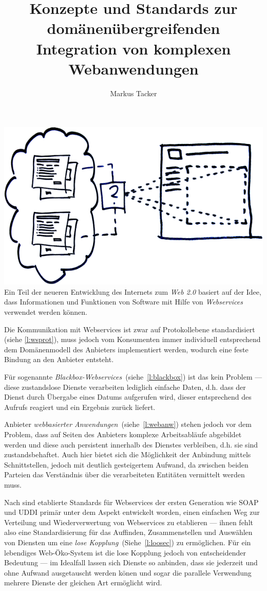 \documentclass[10pt,a4paper]{article}
\begin{document}
\author{Markus Tacker}
\title{Konzepte und Standards zur domänenübergreifenden Integration von komplexen Webanwendungen}
\maketitle
\includegraphics{skizze.png}
Ein Teil der neueren Entwicklung des Internets zum \emph{Web 2.0} basiert auf der Idee, dass Informationen und Funktionen von Software mit Hilfe von \emph{Webservices} verwendet werden können. \cite{hn-web20}

Die Kommunikation mit Webservices ist zwar auf Protokollebene standardisiert (siehe \ref{l:wsprot}), muss jedoch vom Konsumenten immer individuell entsprechend dem Domänenmodell des Anbieters implementiert werden, wodurch eine feste Bindung an den Anbieter entsteht.

Für sogenannte \emph{Blackbox-Webservices}~(siehe~\ref{l:blackbox}) ist das kein Problem --- diese zustandslose Dienste verarbeiten lediglich einfache Daten, d.h. dass der Dienst durch Übergabe eines Datums aufgerufen wird, dieser entsprechend des Aufrufs reagiert und ein Ergebnis zurück liefert.

Anbieter \emph{webbasierter Anwendungen}~(siehe~\ref{l:webanw}) stehen jedoch vor dem Problem, dass auf Seiten des Anbieters komplexe Arbeitsabläufe abgebildet werden und diese auch persistent innerhalb des Dienstes verbleiben, d.h. sie sind zustandsbehaftet. Auch hier bietet sich die Möglichkeit der Anbindung mittels Schnittstellen, jedoch mit deutlich gesteigertem Aufwand, da zwischen beiden Parteien das Verständnis über die verarbeiteten Entitäten vermittelt werden muss. 

Nach \cite[Seite 653]{ei-sawsdl} sind etablierte Standards für Webservices der ersten Generation wie \acs{SOAP} und \acs{UDDI} primär unter dem Aspekt entwickelt worden, einen einfachen Weg zur Verteilung und Wiederverwertung von Webservices zu etablieren --- ihnen fehlt also eine Standardisierung für das Auffinden, Zusammenstellen und Auswählen von Diensten um eine \emph{lose Kopplung}~(Siehe~\ref{l:loosec}) zu ermöglichen. Für ein lebendiges Web-Öko-System ist die lose Kopplung jedoch von entscheidender Bedeutung --- im Idealfall lassen sich Dienste so anbinden, dass sie jederzeit und ohne Aufwand ausgetauscht werden könen und sogar die parallele Verwendung mehrere Dienste der gleichen Art ermöglicht wird.
\end{document}
